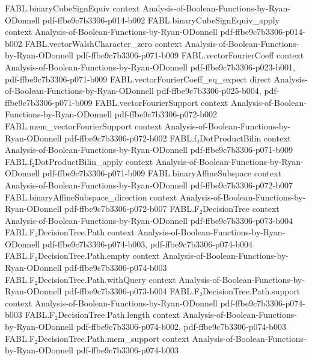 \begin{theorem}
\proofstep
  {FABL.binaryCubeSignEquiv}
  {context}
  {Analysis-of-Boolean-Functions-by-Ryan-ODonnell}
  {pdf-ffbe9c7b3306-p014-b002}
\proofstep
  {FABL.binaryCubeSignEquiv_apply}
  {context}
  {Analysis-of-Boolean-Functions-by-Ryan-ODonnell}
  {pdf-ffbe9c7b3306-p014-b002}
\proofstep
  {FABL.vectorWalshCharacter_zero}
  {context}
  {Analysis-of-Boolean-Functions-by-Ryan-ODonnell}
  {pdf-ffbe9c7b3306-p071-b009}
\proofstep
  {FABL.vectorFourierCoeff}
  {context}
  {Analysis-of-Boolean-Functions-by-Ryan-ODonnell}
  {pdf-ffbe9c7b3306-p023-b001,
    pdf-ffbe9c7b3306-p071-b009}
\proofstep
  {FABL.vectorFourierCoeff_eq_expect}
  {direct}
  {Analysis-of-Boolean-Functions-by-Ryan-ODonnell}
  {pdf-ffbe9c7b3306-p025-b004,
    pdf-ffbe9c7b3306-p071-b009}
\proofstep
  {FABL.vectorFourierSupport}
  {context}
  {Analysis-of-Boolean-Functions-by-Ryan-ODonnell}
  {pdf-ffbe9c7b3306-p072-b002}
\proofstep
  {FABL.mem_vectorFourierSupport}
  {context}
  {Analysis-of-Boolean-Functions-by-Ryan-ODonnell}
  {pdf-ffbe9c7b3306-p072-b002}
\proofstep
  {FABL.f₂DotProductBilin}
  {context}
  {Analysis-of-Boolean-Functions-by-Ryan-ODonnell}
  {pdf-ffbe9c7b3306-p071-b009}
\proofstep
  {FABL.f₂DotProductBilin_apply}
  {context}
  {Analysis-of-Boolean-Functions-by-Ryan-ODonnell}
  {pdf-ffbe9c7b3306-p071-b009}
\proofstep
  {FABL.binaryAffineSubspace}
  {context}
  {Analysis-of-Boolean-Functions-by-Ryan-ODonnell}
  {pdf-ffbe9c7b3306-p072-b007}
\proofstep
  {FABL.binaryAffineSubspace_direction}
  {context}
  {Analysis-of-Boolean-Functions-by-Ryan-ODonnell}
  {pdf-ffbe9c7b3306-p072-b007}
\proofstep
  {FABL.F₂DecisionTree}
  {context}
  {Analysis-of-Boolean-Functions-by-Ryan-ODonnell}
  {pdf-ffbe9c7b3306-p073-b004}
\proofstep
  {FABL.F₂DecisionTree.Path}
  {context}
  {Analysis-of-Boolean-Functions-by-Ryan-ODonnell}
  {pdf-ffbe9c7b3306-p074-b003,
    pdf-ffbe9c7b3306-p074-b004}
\proofstep
  {FABL.F₂DecisionTree.Path.empty}
  {context}
  {Analysis-of-Boolean-Functions-by-Ryan-ODonnell}
  {pdf-ffbe9c7b3306-p074-b003}
\proofstep
  {FABL.F₂DecisionTree.Path.withQuery}
  {context}
  {Analysis-of-Boolean-Functions-by-Ryan-ODonnell}
  {pdf-ffbe9c7b3306-p073-b004}
\proofstep
  {FABL.F₂DecisionTree.Path.support}
  {context}
  {Analysis-of-Boolean-Functions-by-Ryan-ODonnell}
  {pdf-ffbe9c7b3306-p074-b003}
\proofstep
  {FABL.F₂DecisionTree.Path.length}
  {context}
  {Analysis-of-Boolean-Functions-by-Ryan-ODonnell}
  {pdf-ffbe9c7b3306-p074-b002,
    pdf-ffbe9c7b3306-p074-b003}
\proofstep
  {FABL.F₂DecisionTree.Path.mem_support}
  {context}
  {Analysis-of-Boolean-Functions-by-Ryan-ODonnell}
  {pdf-ffbe9c7b3306-p074-b003}

\end{theorem}
